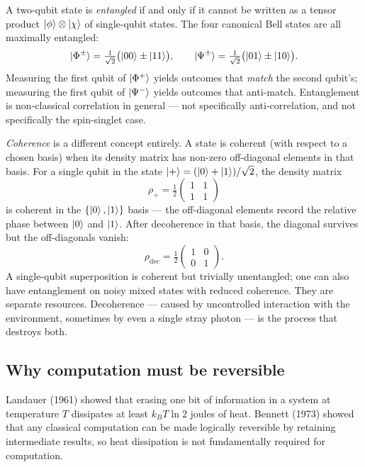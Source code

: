 A two-qubit state is \emph{entangled} if and only if it cannot be written as a tensor product $\mathinner{|{\phi}\rangle}\otimes\mathinner{|{\chi}\rangle}$ of single-qubit states. The four canonical Bell states are all maximally entangled:
\begin{equation}
\mathinner{|{\Phi^\pm}\rangle} = \tfrac{1}{\sqrt{2}}\bigl(\mathinner{|{00}\rangle} \pm \mathinner{|{11}\rangle}\bigr), \qquad
\mathinner{|{\Psi^\pm}\rangle} = \tfrac{1}{\sqrt{2}}\bigl(\mathinner{|{01}\rangle} \pm \mathinner{|{10}\rangle}\bigr).
\end{equation}
Measuring the first qubit of $\mathinner{|{\Phi^+}\rangle}$ yields outcomes that \emph{match} the second qubit's; measuring the first qubit of $\mathinner{|{\Psi^-}\rangle}$ yields outcomes that anti-match. Entanglement is non-classical correlation in general --- not specifically anti-correlation, and not specifically the spin-singlet case.

\emph{Coherence} is a different concept entirely. A state is coherent (with respect to a chosen basis) when its density matrix has non-zero off-diagonal elements in that basis. For a single qubit in the state $\mathinner{|{+}\rangle} = (\mathinner{|{0}\rangle}+\mathinner{|{1}\rangle})/\sqrt{2}$, the density matrix
\begin{equation}
\rho_+ = \tfrac{1}{2}\begin{pmatrix} 1 & 1 \\ 1 & 1 \end{pmatrix}
\end{equation}
is coherent in the $\{\mathinner{|{0}\rangle},\mathinner{|{1}\rangle}\}$ basis --- the off-diagonal elements record the relative phase between $\mathinner{|{0}\rangle}$ and $\mathinner{|{1}\rangle}$. After decoherence in that basis, the diagonal survives but the off-diagonals vanish:
\begin{equation}
\rho_{\text{dec}} = \tfrac{1}{2}\begin{pmatrix} 1 & 0 \\ 0 & 1 \end{pmatrix}.
\end{equation}
A single-qubit superposition is coherent but trivially unentangled; one can also have entanglement on noisy mixed states with reduced coherence. They are separate resources. Decoherence --- caused by uncontrolled interaction with the environment, sometimes by even a single stray photon --- is the process that destroys both.

\subsection{Why computation must be reversible}

Landauer (1961) \cite{landauer1961} showed that erasing one bit of information in a system at temperature $T$ dissipates at least $k_B T \ln 2$ joules of heat. Bennett (1973) \cite{bennett1973} showed that any classical computation can be made logically reversible by retaining intermediate results, so heat dissipation is not fundamentally required for computation.

